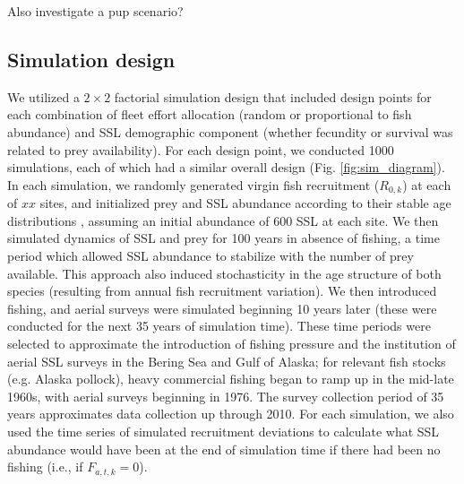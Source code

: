 \documentclass[nonumbib,leqno]{nrc1}
\begin{document}
Also investigate a pup scenario?

\subsection{Simulation design}

We utilized a $2 \times 2$ factorial simulation design that included design points for each combination of fleet effort allocation (random or proportional to fish abundance) and SSL demographic component (whether fecundity or survival was related to prey availability).  For each design point, we conducted 1000 simulations, each of which had a similar overall design (Fig. \ref{fig:sim_diagram}).  
In each simulation, we randomly generated virgin fish recruitment ($R_{0,k}$) at each of $xx$ sites, and initialized prey and SSL abundance according to their stable age distributions \citep[cf.][]{Caswell2001}, assuming an initial abundance of 600 SSL at each site.  We then simulated dynamics of SSL and prey for 100 years in absence of fishing, a time period which allowed SSL abundance to stabilize with the number of prey available.  This approach also induced stochasticity in the age structure of both species (resulting from annual fish recruitment variation).  We then introduced fishing, and aerial surveys were simulated beginning 10 years later (these were conducted for the next 35 years of simulation time).  These time periods were selected to approximate the introduction of fishing pressure and the institution of aerial SSL surveys in the Bering Sea and Gulf of Alaska; for relevant fish stocks (e.g. Alaska pollock), heavy commercial fishing began to ramp up in the mid-late 1960s, with aerial surveys beginning in 1976.  The survey collection period of 35 years approximates data collection up through 2010.  For each simulation, we also used the time series of simulated recruitment deviations to calculate what SSL abundance would have been at the end of simulation time if there had been no fishing (i.e., if $F_{a,t,k}=0$).
\end{document}
